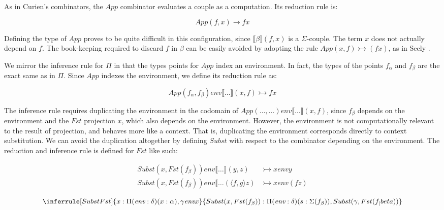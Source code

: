 \documentclass{article}
\newcommand{\affarr}{\rightarrowtail}
\begin{document}
As in Curien's combinators, the \(App\) combinator evaluates a couple as a computation. Its reduction rule is:

\begin{equation}
  App (f, x) \rightarrow f x
\end{equation}

Defining the type of \(App\) proves to be quite difficult in this configuration, since \(\llbracket \beta \rrbracket (f, x)\) is a \(\Sigma\)-couple. The term \(x\) does not actually depend on \(f\). The book-keeping required to discard \(f\) in \(\beta\) can be easily avoided by adopting the rule \(App (x, f) \affarr (f x)\), as in Seely \autocite[p. 39]{Seely_1984}.

We mirror the inference rule for \(\Pi\) in that the types points for \(App\) index an environment. In fact, the types of the points \(f_\alpha\) and \(f_\beta\) are the exact same as in \(\Pi\). Since \(App\) indexes the environment, we define its reduction rule as:

\begin{equation}
  App(f_\alpha, f_\beta) \textit{env} \llbracket \ldots \rrbracket (x, f) \affarr f x
\end{equation}

The inference rule requires duplicating the environment in the codomain of \(App(\ldots, \ldots) \textit{env} \llbracket \ldots \rrbracket (x, f)\), since \(f_\beta\) depends on the environment and the \(Fst\) projection \(x\), which also depends on the environment. However, the environment is not computationally relevant to the result of projection, and behaves more like a context. That is, duplicating the environment corresponds directly to context substitution. We can avoid the duplication altogether by defining \(Subst\) with respect to the combinator depending on the environment. The reduction and inference rule is defined for \(Fst\) like such:

\begin{equation}\label{red_subst_fst}
\begin{split}
  Subst(x, Fst(f_\beta)) \textit{env} \llbracket \ldots \rrbracket (y, z) &\affarr x \textit{env} y\\
  Subst(x, Fst(f_\beta)) \textit{env} \llbracket \ldots (\langle f, g \rangle z) &\affarr x \textit{env} (f z)\\
\end{split}
\end{equation}
\begin{equation}
  \inferrule[Subst Fst]
  { x : \Pi (\textit{env} : \delta) (x : \alpha), \gamma \textit{env} x}
  { Subst(x, Fst(f_\beta)) : \Pi (\textit{env} : \delta) (s : \Sigma(f_\beta)), Subst(\gamma, Fst(f_|beta)) }
\end{equation}
\end{document}
